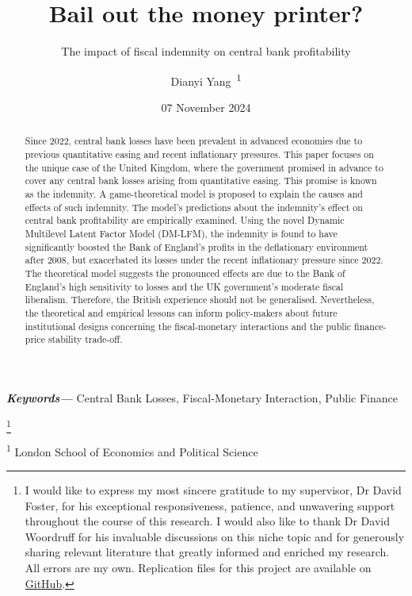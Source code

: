 \documentclass[
  a4paper,
  abstract=true]{scrartcl}
\title{Bail out the money printer?}
\subtitle{The impact of fiscal indemnity on central bank profitability}
\author{Dianyi Yang~\orcidlink{0009-0004-4652-3429}\textsuperscript{1}}
\date{07 November 2024}
\providecommand{\keywords}[1]
{
  \small	
  \textbf
{\textit{Keywords---}} #1
}
\newcommand\blfootnote[1]{%
  \begingroup

  \renewcommand\thefootnote{}\footnote{#1}%
  \addtocounter{footnote}{-1}%
  \endgroup }
\theoremstyle{definition}
\begin{document}
\maketitle
\begin{abstract}
Since 2022, central bank losses have been prevalent in advanced
economies due to previous quantitative easing and recent inflationary
pressures. This paper focuses on the unique case of the United Kingdom,
where the government promised in advance to cover any central bank
losses arising from quantitative easing. This promise is known as the
indemnity. A game-theoretical model is proposed to explain the causes
and effects of such indemnity. The model's predictions about the
indemnity's effect on central bank profitability are empirically
examined. Using the novel Dynamic Multilevel Latent Factor Model
(DM-LFM), the indemnity is found to have significantly boosted the Bank
of England's profits in the deflationary environment after 2008, but
exacerbated its losses under the recent inflationary pressure since
2022. The theoretical model suggests the pronounced effects are due to
the Bank of England's high sensitivity to losses and the UK government's
moderate fiscal liberalism. Therefore, the British experience should not
be generalised. Nevertheless, the theoretical and empirical lessons can
inform policy-makers about future institutional designs concerning the
fiscal-monetary interactions and the public finance-price stability
trade-off.
\end{abstract}
\begin{center}
\keywords{Central Bank Losses, Fiscal-Monetary Interaction, Public
Finance}
\end{center}

\blfootnote{I would like to express my most sincere gratitude to my
supervisor, Dr David Foster, for his exceptional responsiveness,
patience, and unwavering support throughout the course of this research.
I would also like to thank Dr David Woordruff for his invaluable
discussions on this niche topic and for generously sharing relevant
literature that greatly informed and enriched my research. All errors
are my own. Replication files for this project are available on
\href{https://github.com/kv9898/BailoutCB}{GitHub}.}




\textsuperscript{1} London School of Economics and Political Science

\newpage
\end{document}
